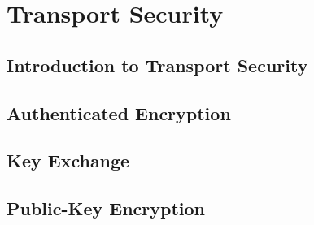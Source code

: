 \documentclass[
letterpaper, %
oneside
]{tufte-book}
\begin{document}


\part{Transport Security}

\chapter{Introduction to Transport Security}



\chapter{Authenticated Encryption}



\chapter{Key Exchange}



\chapter{Public-Key Encryption}




\backmatter



\end{document}
